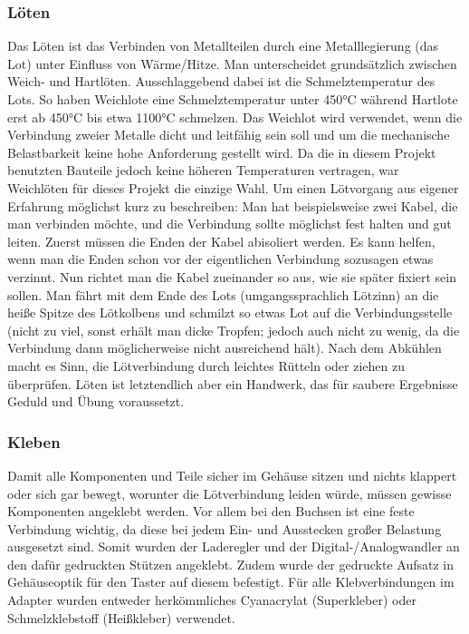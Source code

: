 \documentclass[11pt, twoside]{article}
\begin{document}
\subsubsection{Löten}
\glqq Das Löten ist das Verbinden von Metallteilen durch eine Metalllegierung (das Lot) unter Einfluss von Wärme/Hitze.\grqq{} \parencite{noauthor_urlnl13_nodate} \newline
Man unterscheidet grundsätzlich zwischen Weich- und Hartlöten. Ausschlaggebend dabei ist die Schmelztemperatur des Lots. So haben Weichlote eine Schmelztemperatur unter 450°C während Hartlote erst ab 450°C bis etwa 1100°C schmelzen. \glqq Das Weichlot wird verwendet, wenn die Verbindung zweier Metalle dicht und leitfähig sein soll und um die mechanische Belastbarkeit keine hohe Anforderung gestellt wird.\grqq{} \parencite{noauthor_urlnl13_nodate} \newline
Da die in diesem Projekt benutzten Bauteile jedoch keine höheren Temperaturen vertragen, war Weichlöten für dieses Projekt die einzige Wahl. \newline
Um einen Lötvorgang aus eigener Erfahrung möglichst kurz zu beschreiben:\newline
Man hat beispielsweise zwei Kabel, die man verbinden möchte, und die Verbindung sollte möglichst fest halten und gut leiten. Zuerst müssen die Enden der Kabel abisoliert werden. Es kann helfen, wenn man die Enden schon vor der eigentlichen Verbindung sozusagen etwas \glqq verzinnt\grqq{}. Nun richtet man die Kabel zueinander so aus, wie sie später fixiert sein sollen. Man fährt mit dem Ende des Lots (umgangssprachlich Lötzinn) an die heiße Spitze des Lötkolbens und schmilzt so etwas Lot auf die Verbindungsstelle (nicht zu viel, sonst erhält man dicke Tropfen; jedoch auch nicht zu wenig, da die Verbindung dann möglicherweise nicht ausreichend hält). Nach dem Abkühlen macht es Sinn, die Lötverbindung durch leichtes Rütteln oder ziehen zu überprüfen. Löten ist letztendlich aber ein Handwerk, das für saubere Ergebnisse Geduld und Übung voraussetzt. \parencite[vgl.][]{noauthor_urlnl13_nodate}
\vspace{-3mm}
\subsubsection{Kleben}
Damit alle Komponenten und Teile sicher im Gehäuse sitzen und nichts klappert oder sich gar bewegt, worunter die Lötverbindung leiden würde, müssen gewisse Komponenten angeklebt werden. Vor allem bei den Buchsen ist eine feste Verbindung wichtig, da diese bei jedem Ein- und Ausstecken großer Belastung ausgesetzt sind. Somit wurden der Laderegler und der Digital-/Analogwandler an den dafür gedruckten Stützen angeklebt. Zudem wurde der gedruckte Aufsatz in Gehäuseoptik für den Taster auf diesem befestigt. Für alle Klebverbindungen im Adapter wurden entweder herkömmliches Cyanacrylat (Superkleber) oder Schmelzklebstoff (Heißkleber) verwendet.
\end{document}
